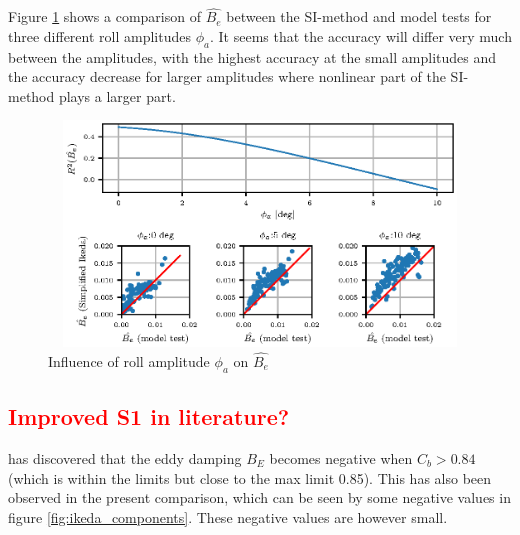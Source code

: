 Figure \ref{fig:ikeda_phi_a} shows a comparison of $\hat{B_e}$ between the SI-method and model tests for three different roll amplitudes $\phi_a$. It seems that the accuracy will differ very much between the amplitudes, with the highest accuracy at the small amplitudes and the accuracy decrease for larger amplitudes where nonlinear part of the SI-method plays a larger part. 
\begin{figure}[H]
\vspace{-0.5cm}
\centering
  \centering
  \includegraphics[height=6cm, width = 14cm]{figures/ikeda_phi_a.eps}
  \vspace{-0.5cm}
  \caption{Influence of roll amplitude $\phi_a$ on $\hat{B_e}$}
  \label{fig:ikeda_phi_a}
\end{figure}


\textcolor{red}{\subsection{Improved S1 in literature?}}
\parencite[]{rudakovic_application_2017} has discovered that the eddy damping $ B_E $ becomes negative when $ C_b>0.84 $ (which is within the limits but close to the max limit 0.85). This has also been observed in the present comparison, which can be seen by some negative values in figure \ref{fig:ikeda_components}. These negative values are however small.

